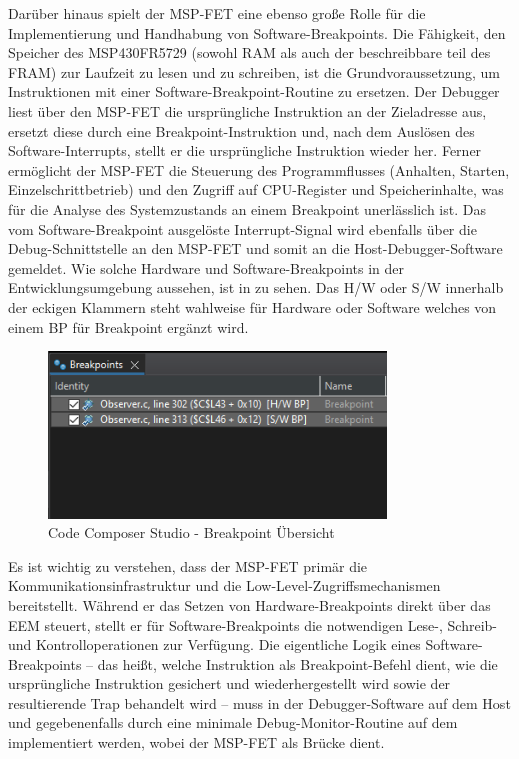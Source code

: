 Dar\"uber hinaus spielt der MSP-FET eine ebenso gro{\ss}e Rolle f\"ur die Implementierung und Handhabung von Software-Breakpoints. Die F\"ahigkeit, den Speicher des MSP430FR5729 (sowohl RAM als auch der beschreibbare teil des FRAM) zur Laufzeit zu lesen und zu schreiben, ist die Grundvoraussetzung, um Instruktionen mit einer Software-Breakpoint-Routine zu ersetzen. Der Debugger liest \"uber den MSP-FET die urspr\"ungliche Instruktion an der Zieladresse aus, ersetzt diese durch eine Breakpoint-Instruktion und, nach dem Ausl\"osen des Software-Interrupts, stellt er die urspr\"ungliche Instruktion wieder her. Ferner erm\"oglicht der MSP-FET die Steuerung des Programmflusses (Anhalten, Starten, Einzelschrittbetrieb) und den Zugriff auf CPU-Register und Speicherinhalte, was f\"ur die Analyse des Systemzustands an einem Breakpoint unerl\"asslich ist. Das vom Software-Breakpoint ausgel\"oste Interrupt-Signal wird ebenfalls \"uber die Debug-Schnittstelle an den MSP-FET und somit an die Host-Debugger-Software gemeldet. Wie solche Hardware und Software-Breakpoints in der Entwicklungsumgebung aussehen, ist in  zu sehen. Das \glqq{}H/W\grqq{} oder \glqq{}S/W\grqq{} innerhalb der eckigen Klammern steht wahlweise f\"ur \glqq{}Hardware\grqq{} oder \glqq{}Software\grqq{} welches von einem \glqq{}BP\grqq{} f\"ur \glqq{}Breakpoint\grqq{} erg\"anzt wird.

\newpage
\begin{figure}[h!]
	\centering
	\includegraphics[width=0.80\textwidth]{../Bilder/HW_SW_Breakpoint.png}
	\caption{Code Composer Studio - Breakpoint \"Ubersicht}
	\label{fig:CCS_SetBR}
\end{figure}

Es ist wichtig zu verstehen, dass der MSP-FET prim\"ar die Kommunikationsinfrastruktur und die Low-Level-Zugriffsmechanismen bereitstellt. W\"ahrend er das Setzen von Hardware-Breakpoints direkt \"uber das EEM steuert, stellt er f\"ur Software-Breakpoints die notwendigen Lese-, Schreib- und Kontrolloperationen zur Verf\"ugung. Die eigentliche Logik eines Software-Breakpoints – das hei{\ss}t, welche Instruktion als Breakpoint-Befehl dient, wie die urspr\"ungliche Instruktion gesichert und wiederhergestellt wird sowie der resultierende Trap behandelt wird -- muss in der Debugger-Software auf dem Host und gegebenenfalls durch eine minimale Debug-Monitor-Routine auf dem  implementiert werden, wobei der MSP-FET als Br\"ucke dient. 

